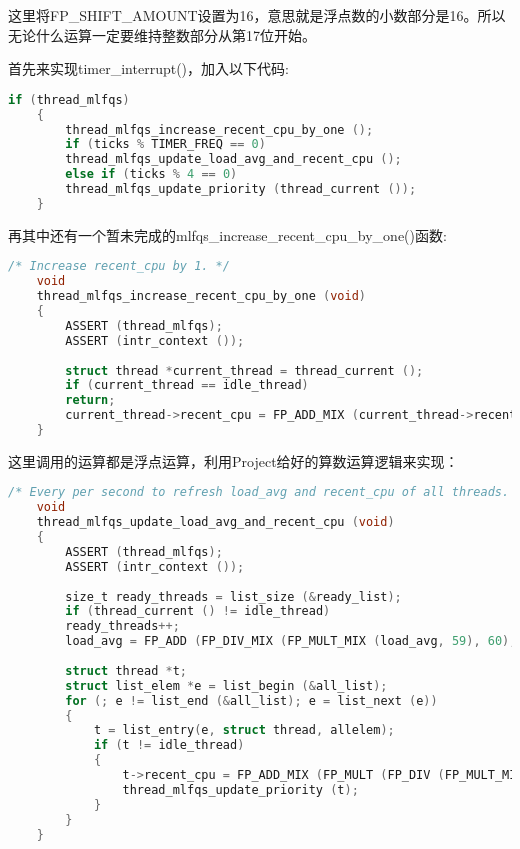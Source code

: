 \documentclass{article}
\begin{document}
	这里将FP\_SHIFT\_AMOUNT设置为16，意思就是浮点数的小数部分是16。所以无论什么运算一定要维持整数部分从第17位开始。
	
	首先来实现timer\_interrupt()，加入以下代码:
	
	\begin{lstlisting}[language=C, title=函数timer\_interrupt()]
    if (thread_mlfqs)
    {
    	thread_mlfqs_increase_recent_cpu_by_one ();
    	if (ticks % TIMER_FREQ == 0)
    	thread_mlfqs_update_load_avg_and_recent_cpu ();
    	else if (ticks % 4 == 0)
    	thread_mlfqs_update_priority (thread_current ());
    }
	\end{lstlisting}
	
	再其中还有一个暂未完成的mlfqs\_increase\_recent\_cpu\_by\_one()函数:
	
	\begin{lstlisting}[language=C, title=函数thread\_mlfqs\_increase\_recent\_cpu\_by\_one]
    /* Increase recent_cpu by 1. */
    void
    thread_mlfqs_increase_recent_cpu_by_one (void)
    {
    	ASSERT (thread_mlfqs);
    	ASSERT (intr_context ());
    	
    	struct thread *current_thread = thread_current ();
    	if (current_thread == idle_thread)
    	return;
    	current_thread->recent_cpu = FP_ADD_MIX (current_thread->recent_cpu, 1);
    }
	\end{lstlisting}
	
	这里调用的运算都是浮点运算，利用Project给好的算数运算逻辑来实现：
	
	\begin{lstlisting}[language=C, title= thread\_mlfqs\_update\_priority()]
	/* Every per second to refresh load_avg and recent_cpu of all threads. */
    void
    thread_mlfqs_update_load_avg_and_recent_cpu (void)
    {
    	ASSERT (thread_mlfqs);
    	ASSERT (intr_context ());
    	
    	size_t ready_threads = list_size (&ready_list);
    	if (thread_current () != idle_thread)
    	ready_threads++;
    	load_avg = FP_ADD (FP_DIV_MIX (FP_MULT_MIX (load_avg, 59), 60), FP_DIV_MIX (FP_CONST (ready_threads), 60));
    	
    	struct thread *t;
    	struct list_elem *e = list_begin (&all_list);
    	for (; e != list_end (&all_list); e = list_next (e))
    	{
    		t = list_entry(e, struct thread, allelem);
    		if (t != idle_thread)
    		{
    			t->recent_cpu = FP_ADD_MIX (FP_MULT (FP_DIV (FP_MULT_MIX (load_avg, 2), FP_ADD_MIX (FP_MULT_MIX (load_avg, 2), 1)), t->recent_cpu), t->nice);
    			thread_mlfqs_update_priority (t);
    		}
    	}
    }
	\end{lstlisting}
	
\end{document}
